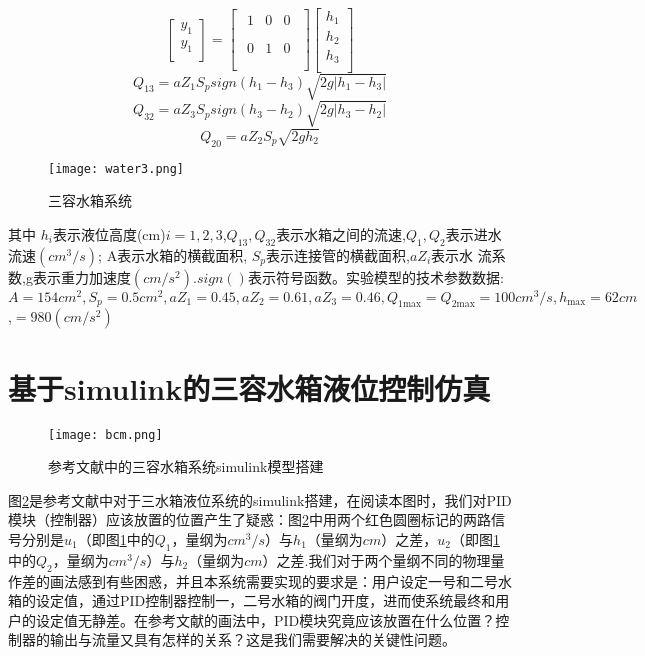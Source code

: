 \documentclass{WHUMaster}   %
\begin{document}
\begin{equation}
\left[ \begin{array}{c}
y_1\\
y_1\\
\end{array} \right] =\left[ \begin{array}{c}
\begin{matrix}
1&		0&		0\\
\end{matrix}\\
\begin{matrix}
0&		1&		0\\
\end{matrix}\\
\end{array} \right] \left[ \begin{array}{c}
h_1\\
h_2\\
h_3\\
\end{array} \right] 
\label{water3.1}
\end{equation}
$$
Q_{13}=aZ_1S_psign\left( h_1-h_3 \right) \sqrt{2g\left| h_1-h_3 \right|}
$$
$$
Q_{32}=aZ_3S_psign\left( h_3-h_2 \right) \sqrt{2g\left| h_3-h_2 \right|}
$$
$$
Q_{20}=aZ_2S_p\sqrt{2gh_2}
$$



\begin{figure}[h]
	\small
	\centering
	\texttt{[image: water3.png]}
	\caption{三容水箱系统} \label{fig7}
\end{figure}
其中 $h_i$表示液位高度(cm)$i=1,2,3$,$Q_{13},Q_{32}$表示水箱之间的流速,$Q_1,Q_2$表示进水流速$\left( cm^3/s \right)$; A表示水箱的横截面积, $S_p$表示连接管的横截面积,$aZ_i$表示水
流系数,g表示重力加速度$\left( cm/s^2 \right)$.$sign\left(  \right) $表示符号函数。实验模型的技术参数数据:$A=154cm^2,S_p=0.5cm^2,aZ_1=0.45,aZ_2=0.61,aZ_3=0.46,Q_{\text{1}\max}=Q_{\text{2}\max}=100cm^3/s,h_{\max}=62cm$,$=980\left( cm/s^2 \right) $
\section{基于simulink的三容水箱液位控制仿真}

\begin{figure}[h]
	\small
	\centering
	\texttt{[image: bcm.png]}
	\caption{参考文献中的三容水箱系统simulink模型搭建} \label{fig8}
\end{figure}

图\ref{fig8}是参考文献中对于三水箱液位系统的simulink搭建，在阅读本图时，我们对PID模块（控制器）应该放置的位置产生了疑惑：图\ref{fig8}中用两个红色圆圈标记的两路信号分别是$u_1$（即图\ref{fig7}中的$Q_1$，量纲为$cm^3/s$）与$h_1$（量纲为$cm$）之差，$u_2$（即图\ref{fig7}中的$Q_2$，量纲为$cm^3/s$）与$h_2$（量纲为$cm$）之差.我们对于两个量纲不同的物理量作差的画法感到有些困惑，并且本系统需要实现的要求是：用户设定一号和二号水箱的设定值，通过PID控制器控制一，二号水箱的阀门开度，进而使系统最终和用户的设定值无静差。在参考文献的画法中，PID模块究竟应该放置在什么位置？控制器的输出与流量又具有怎样的关系？这是我们需要解决的关键性问题。
\end{document}
